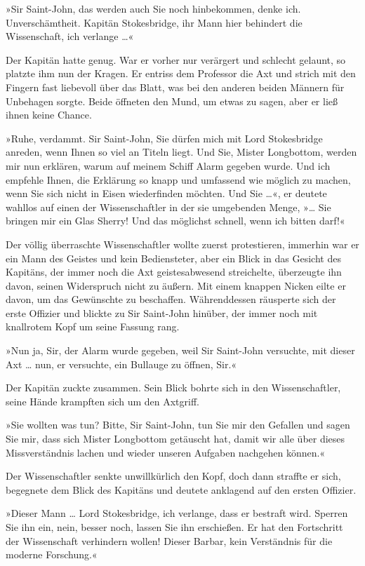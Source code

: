 »Sir Saint-John, das werden auch Sie noch hinbekommen, denke ich.
Unverschämtheit. Kapitän Stokesbridge, ihr Mann hier behindert die
Wissenschaft, ich verlange \ldots{}«

Der Kapitän hatte genug. War er vorher nur verärgert und schlecht
gelaunt, so platzte ihm nun der Kragen. Er entriss dem Professor
die Axt und strich mit den Fingern fast liebevoll über das Blatt,
was bei den anderen beiden Männern für Unbehagen sorgte. Beide
öffneten den Mund, um etwas zu sagen, aber er ließ ihnen keine
Chance.

»Ruhe, verdammt. Sir Saint-John, Sie dürfen mich mit Lord
Stokesbridge anreden, wenn Ihnen so viel an Titeln liegt. Und Sie,
Mister Longbottom, werden mir nun erklären, warum auf meinem Schiff
Alarm gegeben wurde. Und ich empfehle Ihnen, die Erklärung so knapp
und umfassend wie möglich zu machen, wenn Sie sich nicht in Eisen
wiederfinden möchten. Und Sie \ldots{}«, er deutete wahllos auf einen
der Wissenschaftler in der sie umgebenden Menge, »\ldots{} Sie bringen
mir ein Glas Sherry! Und das möglichst schnell, wenn ich bitten
darf!«

Der völlig überraschte Wissenschaftler wollte zuerst protestieren,
immerhin war er ein Mann des Geistes und kein Bediensteter, aber
ein Blick in das Gesicht des Kapitäns, der immer noch die Axt
geistesabwesend streichelte, überzeugte ihn davon, seinen
Widerspruch nicht zu äußern. Mit einem knappen Nicken eilte er
davon, um das Gewünschte zu beschaffen. Währenddessen räusperte
sich der erste Offizier und blickte zu Sir Saint-John hinüber, der
immer noch mit knallrotem Kopf um seine Fassung rang.

»Nun ja, Sir, der Alarm wurde gegeben, weil Sir Saint-John
versuchte, mit dieser Axt \ldots{} nun, er versuchte, ein Bullauge zu
öffnen, Sir.«

Der Kapitän zuckte zusammen. Sein Blick bohrte sich in den
Wissenschaftler, seine Hände krampften sich um den Axtgriff.

»Sie wollten was tun? Bitte, Sir Saint-John, tun Sie mir den
Gefallen und sagen Sie mir, dass sich Mister Longbottom getäuscht
hat, damit wir alle über dieses Missverständnis lachen und wieder
unseren Aufgaben nachgehen können.«

Der Wissenschaftler senkte unwillkürlich den Kopf, doch dann
straffte er sich, begegnete dem Blick des Kapitäns und deutete
anklagend auf den ersten Offizier.

»Dieser Mann \ldots{} Lord Stokesbridge, ich verlange, dass er bestraft
wird. Sperren Sie ihn ein, nein, besser noch, lassen Sie ihn
erschießen. Er hat den Fortschritt der Wissenschaft verhindern
wollen! Dieser Barbar, kein Verständnis für die moderne
Forschung.«

